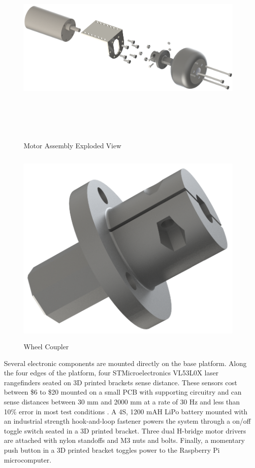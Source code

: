 \begin{figure}[H]   %
	\centering \includegraphics[width=6in, height=3.85in, keepaspectratio]{figures/motor_assem_explode.png}
	\caption{Motor Assembly Exploded View}	\label{fig:motor_assem_explode}
\end{figure}
\begin{figure}[H]   %
	\centering \includegraphics[width=6in, height=3.85in, keepaspectratio]{figures/wheel_coupler.png}
	\caption{Wheel Coupler}	\label{fig:wheel_coupler}
\end{figure}

Several electronic components are mounted directly on the base platform. Along the four edges of the platform, four STMicroelectronics VL53L0X laser rangefinders seated on 3D printed brackets sense distance. These sensors cost between \$6 to \$20 mounted on a small PCB with supporting circuitry and can sense distances between 30 mm and 2000 mm at a rate of 30 Hz and less than 10\% error in most test conditions \cite{vl53l0x_datasheet}. A 4S, 1200 mAH LiPo battery mounted with an industrial strength hook-and-loop fastener powers the system through a on/off toggle switch seated in a 3D printed bracket. Three dual H-bridge motor drivers are attached with nylon standoffs and M3 nuts and bolts. Finally, a momentary push button in a 3D printed bracket toggles power to the Raspberry Pi microcomputer.

